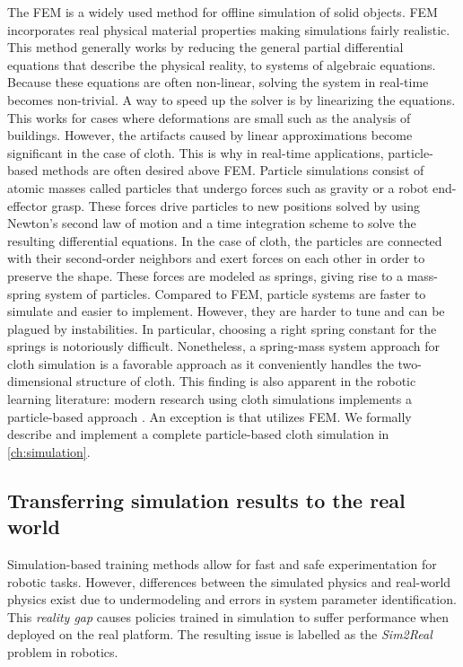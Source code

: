 \documentclass[\home/main.tex]{subfiles}
\begin{document}
The \gls{FEM} is a widely used method for offline simulation of solid objects. \Gls{FEM} incorporates real physical material properties making simulations fairly realistic. This method generally works by reducing the general partial differential equations that describe the physical reality, to systems of algebraic equations. Because these equations are often non-linear, solving the system in real-time becomes non-trivial. A way to speed up the solver is by linearizing the equations. This works for cases where deformations are small such as the analysis of buildings. However, the artifacts caused by linear approximations become significant in the case of cloth. This is why in real-time applications, particle-based methods are often desired above \gls{FEM}. Particle simulations consist of atomic masses called particles that undergo forces such as gravity or a robot end-effector grasp. These forces drive particles to new positions solved by using Newton's second law of motion and a time integration scheme to solve the resulting differential equations. In the case of cloth, the particles are connected with their second-order neighbors and exert forces on each other in order to preserve the shape. These forces are modeled as springs, giving rise to a mass-spring system of particles. Compared to \gls{FEM}, particle systems are faster to simulate and easier to implement. However, they are harder to tune and can be plagued by instabilities. In particular, choosing a right spring constant for the springs is notoriously difficult. Nonetheless, a spring-mass system approach for cloth simulation is a favorable approach as it conveniently handles the two-dimensional structure of cloth. This finding is also apparent in the robotic learning literature: modern research using cloth simulations implements a particle-based approach \autocite{Matas2018,seita2021learning,dedo,softgym}. An exception is \autocite{liang2019differentiable} that utilizes \gls{FEM}. We formally describe and implement a complete particle-based cloth simulation in \cref{ch:simulation}.

\subsection{Transferring simulation results to the real world}  \label{sec:lit_sim2real}

Simulation-based training methods allow for fast and safe experimentation for robotic tasks. However, differences between the simulated physics and real-world physics exist due to undermodeling and errors in system parameter identification. This \emph{reality gap} causes policies trained in simulation to suffer performance when deployed on the real platform. The resulting issue is labelled as the \emph{Sim2Real} problem in robotics.
\end{document}
